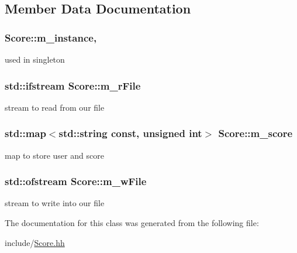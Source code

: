 \subsection{Member Data Documentation}
\hypertarget{class_score_ab4a91380380653fa12041d598c6af413}{}
\subsubsection[{m\+\_\+instance}]{ Score\+::m\+\_\+instance\hspace{0.3cm}{\ttfamily [static]}, {\ttfamily [private]}}\label{class_score_ab4a91380380653fa12041d598c6af413}
used in singleton \hypertarget{class_score_ad2f89d43a25f346c8a90951ca94cca38}{}
\subsubsection[{m\+\_\+r\+File}]{\setlength{\rightskip}{0pt plus 5cm}std\+::ifstream Score\+::m\+\_\+r\+File\hspace{0.3cm}{\ttfamily [private]}}\label{class_score_ad2f89d43a25f346c8a90951ca94cca38}
stream to read from our file \hypertarget{class_score_a6eba3f6ec553d618869dcd0355d47934}{}
\subsubsection[{m\+\_\+score}]{\setlength{\rightskip}{0pt plus 5cm}std\+::map$<$std\+::string const, unsigned int$>$ Score\+::m\+\_\+score\hspace{0.3cm}{\ttfamily [private]}}\label{class_score_a6eba3f6ec553d618869dcd0355d47934}
map to store user and score \hypertarget{class_score_a8e223eb909ffc9773a466d3e3adae2ad}{}
\subsubsection[{m\+\_\+w\+File}]{\setlength{\rightskip}{0pt plus 5cm}std\+::ofstream Score\+::m\+\_\+w\+File\hspace{0.3cm}{\ttfamily [private]}}\label{class_score_a8e223eb909ffc9773a466d3e3adae2ad}
stream to write into our file 

The documentation for this class was generated from the following file\+:\begin{DoxyCompactItemize}
\item 
include/\hyperlink{_score_8hh}{Score.\+hh}\end{DoxyCompactItemize}
